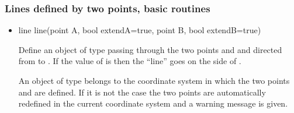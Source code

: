\documentclass[pdftex]{article}
\begin{document}
\subsubsection{Lines defined by two points, basic routines}
\begin{itemize}
\item {}%
  \begin{Vcolor}
    line line(point A, bool extendA=true, point B, bool extendB=true)
  \end{Vcolor}
  Define an object of type  passing through the two
  points   and  and directed from 
  to . If the value of  is  then
  the ``line'' goes on the side of .

  An object of type  belongs to the coordinate system in
  which the two points  and  are defined. If it is
  not the case the two points are automatically redefined in the
  current coordinate system and a warning message is given.


\end{itemize}
\end{document}
